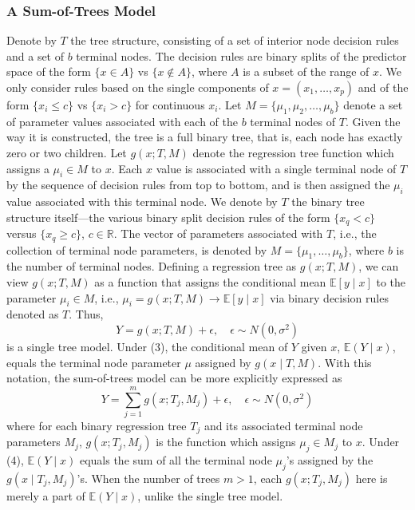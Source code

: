 \documentclass[a4paper,11pt]{article}
\begin{document}
\subsubsection{A Sum-of-Trees Model}
Denote by \( T \) the tree structure, consisting of a set of interior node decision rules and a set of $b$ terminal nodes. The decision rules are binary splits of the predictor space of the form \( \{x \in A\} \) vs \( \{x \notin A\} \), where \( A \) is a subset of the range of \( x \). We only consider rules based on the single components of \( x = (x_1, \dots, x_p) \) and of the form \( \{x_i \leq c\} \) vs \( \{x_i > c\} \) for continuous \( x_i \). Let \( M = \{\mu_1, \mu_2, \dots, \mu_b\} \) denote a set of parameter values associated with each of the \( b \) terminal nodes of \( T \). Given the way it is constructed, the tree is a full binary tree, that is, each node has exactly zero or two children. 
 Let \( g(x; T, M) \) denote the regression tree function which assigns a \( \mu_i \in M \) to \( x \).
Each \( x \) value is associated with a single terminal node of \( T \) by the sequence of decision rules from top to bottom, and is then assigned the \( \mu_i \) value associated with this terminal node. 
We denote by \( T \) the binary tree structure itself—the various binary split decision rules of the form \( \{x_q < c\} \) versus \( \{x_q \geq c\} \), \( c \in \mathbb{R} \). The vector of parameters associated with \( T \), i.e., the collection of terminal node parameters, is denoted by \( M = \{\mu_1, \ldots, \mu_b\} \), where \( b \) is the number of terminal nodes. Defining a regression tree as \( g(x; T, M) \), we can view \( g(x; T, M) \) as a function that assigns the conditional mean \( \mathbb{E}[y \mid x] \) to the parameter \( \mu_i \in M \), i.e., \( \mu_i = g(x; T, M) \rightarrow \mathbb{E}[y \mid x] \) via binary decision rules denoted as \( T \).
Thus,
\begin{equation}
Y = g(x; T, M) + \epsilon, \quad \epsilon \sim N(0, \sigma^2)
\end{equation}
is a single tree model. Under (3), the conditional mean of \( Y \) given \( x \), \( \mathbb{E}(Y \mid x) \), equals the terminal node parameter \( \mu \) assigned by \( g(x \mid T, M) \).
With this notation, the sum-of-trees model can be more explicitly expressed as
\begin{equation}
Y = \sum_{j=1}^m g(x; T_j, M_j) + \epsilon, \quad \epsilon \sim N(0, \sigma^2) \label{likelihood}
\end{equation}
where for each binary regression tree \( T_j \) and its associated terminal node parameters \( M_j \), \( g(x; T_j, M_j) \) is the function which assigns \( \mu_{j} \in M_j \) to \( x \). Under (4), \( \mathbb{E}(Y \mid x) \) equals the sum of all the terminal node \( \mu_{j} \)'s assigned by the \( g(x \mid T_j, M_j) \)'s. When the number of trees \( m > 1 \), each \( g(x; T_j, M_j) \) here is merely a part of \( \mathbb{E}(Y \mid x) \), unlike the single tree model.
\end{document}
